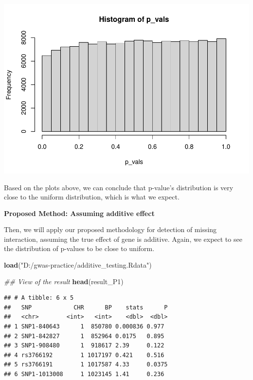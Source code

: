\documentclass[
]{article}
\newenvironment{Shaded}{\begin{snugshade}}{\end{snugshade}}
\newcommand{\CommentTok}[1]{\textcolor[rgb]{0.56,0.35,0.01}{\textit{#1}}}
\newcommand{\KeywordTok}[1]{\textcolor[rgb]{0.13,0.29,0.53}{\textbf{#1}}}
\newcommand{\NormalTok}[1]{#1}
\newcommand{\StringTok}[1]{\textcolor[rgb]{0.31,0.60,0.02}{#1}}
\begin{document}
\includegraphics{stats-gene-research-progress-v6_files/figure-latex/unnamed-chunk-2-3.pdf}

Based on the plots above, we can conclude that p-value's distribution is
very close to the uniform distribution, which is what we expect.

\clearpage

\textbf{Proposed Method: Assuming additive effect}

Then, we will apply our proposed methodology for detection of missing
interaction, assuming the true effect of gene is additive. Again, we
expect to see the distribution of p-values to be close to uniform.

\begin{Shaded}
\begin{Highlighting}[]
\KeywordTok{load}\NormalTok{(}\StringTok{"D:/gwas-practice/additive_testing.Rdata"}\NormalTok{)}

\CommentTok{## View of the result}
\KeywordTok{head}\NormalTok{(result_P1)}
\end{Highlighting}
\end{Shaded}

\begin{verbatim}
## # A tibble: 6 x 5
##   SNP            CHR      BP    stats      P
##   <chr>        <int>   <int>    <dbl>  <dbl>
## 1 SNP1-840643      1  850780 0.000836 0.977 
## 2 SNP1-842827      1  852964 0.0175   0.895 
## 3 SNP1-908480      1  918617 2.39     0.122 
## 4 rs3766192        1 1017197 0.421    0.516 
## 5 rs3766191        1 1017587 4.33     0.0375
## 6 SNP1-1013008     1 1023145 1.41     0.236
\end{verbatim}
\end{document}
